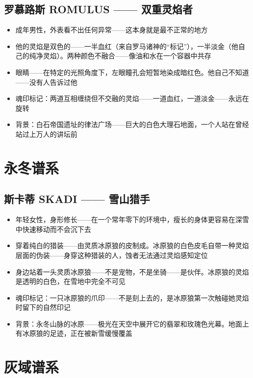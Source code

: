 \documentclass[12pt,a4paper,openany]{ctexbook}
\begin{document}
\subsection{罗慕路斯 ROMULUS —— 双重灵焰者}
\begin{itemize}
    \item 成年男性，外表看不出任何异常——这本身就是最不正常的地方
    \item 他的灵焰是双色的——一半血红（来自罗马诸神的“标记”），一半淡金（他自己的纯净灵焰）。两种颜色不融合——像油和水在一个容器中共存
    \item 眼睛——在特定的光照角度下，左眼瞳孔会短暂地染成暗红色。他自己不知道——没有人告诉过他
    \item 魂印标记：两道互相缠绕但不交融的灵焰——一道血红，一道淡金——永远在旋转
    \item 背景：白石帝国遗址的律法广场——巨大的白色大理石地面，一个人站在曾经站过上万人的讲坛前
\end{itemize}

\section{永冬谱系}

\subsection{斯卡蒂 SKADI —— 雪山猎手}
\begin{itemize}
    \item 年轻女性，身形修长——在一个常年零下的环境中，瘦长的身体更容易在深雪中快速移动而不会沉下去
    \item 穿着纯白的猎装——由灵质冰原狼的皮制成。冰原狼的白色皮毛自带一种灵焰层面的伪装——身穿这种猎装的人，蚀者无法通过灵焰感知定位
    \item 身边站着一头灵质冰原狼——不是宠物，不是坐骑——是伙伴。冰原狼的灵焰是透明的白色，在雪地中完全不可见
    \item 魂印标记：一只冰原狼的爪印——不是刻上去的，是冰原狼第一次触碰她灵焰时留下的自然印记
    \item 背景：永冬山脉的冰原——极光在天空中展开它的翡翠和玫瑰色光幕。地面上有冰原狼的足迹，正在被新雪缓慢覆盖
\end{itemize}

\section{灰域谱系}
\end{document}
